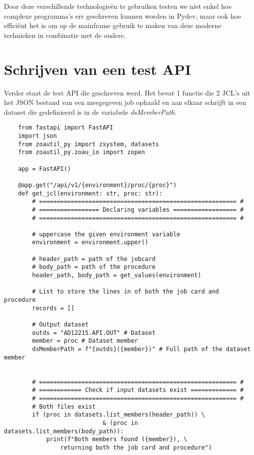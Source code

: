 Door deze verschillende technologieën te gebruiken testen we niet enkel hoe complexe programma's err geschreven kunnen worden in Pydev, maar ook hoe efficiënt het is om op de mainframe gebruik te maken van deze moderne technieken in combinatie met de oudere.

\section{Schrijven van een test API}
Verder staat de test API die geschreven werd. Het bevat 1 functie die 2 JCL's uit het JSON bestand van een meegegeven job ophaald en aan elkaar schrijft in een dataset die gedefinieerd is in de variabele \textit{dsMemberPath}. 
\begin{lstlisting}
    from fastapi import FastAPI
    import json
    from zoautil_py import zsystem, datasets
    from zoautil_py.zoau_io import zopen
    
    app = FastAPI()
    
    @app.get("/api/v1/{environment}/proc/{proc}")
    def get_jcl(environment: str, proc: str):
        # ======================================================== #
        # ================= Declaring variables ================== #
        # ======================================================== #
        
        # uppercase the given environment variable
        environment = environment.upper()
        
        # header_path = path of the jobcard
        # body_path = path of the procedure
        header_path, body_path = get_values(environment)
        
        # List to store the lines in of both the job card and procedure
        records = []
        
        # Output dataset
        outds = "AD12215.API.OUT" # Dataset
        member = proc # Dataset member
        dsMemberPath = f"{outds}({member})" # Full path of the dataset member
        
        
        # ======================================================== #
        # ============ Check if input datasets exist ============= #
        # ======================================================== #
        # Both files exist
        if (proc in datasets.list_members(header_path)) \
                            & (proc in datasets.list_members(body_path)):
            print(f"Both members found ({member}), \
                returning both the job card and procedure")
        

\end{lstlisting}
